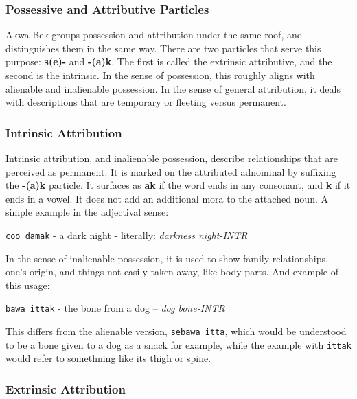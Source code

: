 \documentclass[11pt,letterpaper]{article}
\begin{document}
    \subsubsection{Possessive and Attributive Particles}
    \label{attributive}
    Akwa Bek groups possession and attribution under the same roof, and distinguishes them in the same way. There are two particles that serve this purpose: \textbf{s(e)-} and \textbf{-(a)k}. The first is called the extrinsic attributive, and the second is the intrinsic. In the sense of possession, this roughly aligns with alienable and inalienable possession. In the sense of general attribution, it deals with descriptions that are temporary or fleeting versus permanent.
    \par
    \subsubsection{Intrinsic Attribution}
    \label{intrinsic}
    Intrinsic attribution, and inalienable possession, describe relationships that are perceived as permanent. It is marked on the attributed adnominal by suffixing the \textbf{-(a)k} particle. It surfaces as \textbf{ak} if the word ends in any consonant, and \textbf{k} if it ends in a vowel. It does not add an additional mora to the attached noun. A simple example in the adjectival sense:
    \par
    \texttt{coo damak} - a dark night - literally: \textit{darkness night-INTR}
    \par
    In the sense of inalienable possession, it is used to show family relationships, one's origin, and things not easily taken away, like body parts. And example of this usage:
    \par
    \texttt{bawa ittak} - the bone from a dog -- \textit{dog bone-INTR}
    \par
    This differs from the alienable version, \texttt{sebawa itta}, which would be understood to be a bone given to a dog as a snack for example, while the example with \texttt{ittak} would refer to somethning like its thigh or spine.
    \par
    \subsubsection{Extrinsic Attribution}
    \label{extrinsic}
\end{document}
